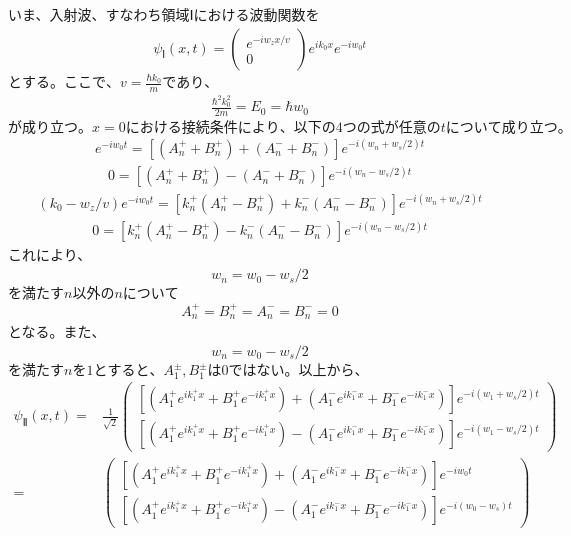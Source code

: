 いま、入射波、すなわち領域Ⅰにおける波動関数を
\begin{align}
{\psi}_{Ⅰ}(x,t)=
\begin{pmatrix}
e^{-iw_{z}x/v} \\
0
\end{pmatrix}
e^{ik_{0}x}e^{-iw_{0}t}
\end{align}
$とする。ここで、v=\frac{{\hbar}k_{0}}{m}であり、$
\begin{align}
\frac{{{\hbar}^2}k_{0}^2}{2m}=E_{0}={\hbar}w_{0}
\end{align}
$が成り立つ。x=0における接続条件により、以下の4つの式が任意のtについて成り立つ。$
\begin{align}
e^{-iw_{0}t}=\left[(A_{n}^{+}+B_{n}^{+})+(A_{n}^{-}+B_{n}^{-})\right]e^{-i(w_{n}+w_{s}/2)t}
\end{align}
\begin{align}
0=\left[(A_{n}^{+}+B_{n}^{+})-(A_{n}^{-}+B_{n}^{-})\right]e^{-i(w_{n}-w_{s}/2)t}
\end{align}
\begin{align}
(k_{0}-w_{z}/v)e^{-iw_{0}t}=\left[k_{n}^{+}(A_{n}^{+}-B_{n}^{+})+k_{n}^{-}(A_{n}^{-}-B_{n}^{-})\right]e^{-i(w_{n}+w_{s}/2)t}
\end{align}
\begin{align}
0=\left[k_{n}^{+}(A_{n}^{+}-B_{n}^{+})-k_{n}^{-}(A_{n}^{-}-B_{n}^{-})\right]e^{-i(w_{n}-w_{s}/2)t}
\end{align}
これにより、
\begin{align}
w_{n}=w_{0}-w_{s}/2
\end{align}
$を満たすn以外のnについて$
\begin{align}
A_{n}^{+}=B_{n}^{+}=A_{n}^{-}=B_{n}^{-}=0
\end{align}
となる。また、
\begin{align}
w_{n}=w_{0}-w_{s}/2
\end{align}
$を満たすnを1とすると、A_{1}^{\pm},B_{1}^{\pm}は0ではない。以上から、$
\begin{align}
{\psi}_{Ⅱ}(x,t)=&\frac{1}{\sqrt{2}}
\begin{pmatrix}
\left[(A_{1}^{+}e^{ik_{1}^{+}x}+B_{1}^{+}e^{-ik_{1}^{+}x})+(A_{1}^{-}e^{ik_{1}^{-}x}+B_{1}^{-}e^{-ik_{1}^{-}x})\right]e^{-i(w_{1}+w_{s}/2)t} \\
\left[(A_{1}^{+}e^{ik_{1}^{+}x}+B_{1}^{+}e^{-ik_{1}^{+}x})-(A_{1}^{-}e^{ik_{1}^{-}x}+B_{1}^{-}e^{-ik_{1}^{-}x})\right]e^{-i(w_{1}-w_{s}/2)t}
\end{pmatrix}\\
=&\begin{pmatrix}
\left[(A_{1}^{+}e^{ik_{1}^{+}x}+B_{1}^{+}e^{-ik_{1}^{+}x})+(A_{1}^{-}e^{ik_{1}^{-}x}+B_{1}^{-}e^{-ik_{1}^{-}x})\right]e^{-iw_{0}t} \\
\left[(A_{1}^{+}e^{ik_{1}^{+}x}+B_{1}^{+}e^{-ik_{1}^{+}x})-(A_{1}^{-}e^{ik_{1}^{-}x}+B_{1}^{-}e^{-ik_{1}^{-}x})\right]e^{-i(w_{0}-w_{s})t}
\end{pmatrix}
\end{align}
